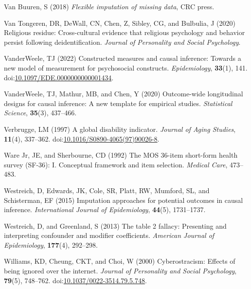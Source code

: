 \documentclass[
  singlecolumn,
  9pt]{article}
\newlength{\cslhangindent}
\newenvironment{CSLReferences}[2] %
 {\begin{list}{}{%
  \setlength{\itemindent}{0pt}
  \setlength{\leftmargin}{0pt}
  \setlength{\parsep}{0pt}
  \ifodd #1
   \setlength{\leftmargin}{\cslhangindent}
   \setlength{\itemindent}{-1\cslhangindent}
  \fi
  \setlength{\itemsep}{#2\baselineskip}}}
 {\end{list}}
\begin{document}
\begin{CSLReferences}{1}{0}
Van Buuren, S (2018) \emph{Flexible imputation of missing data}, CRC
press.

Van Tongeren, DR, DeWall, CN, Chen, Z, Sibley, CG, and Bulbulia, J
(2020) Religious residue: Cross-cultural evidence that religious
psychology and behavior persist following deidentification.
\emph{Journal of Personality and Social Psychology}.

VanderWeele, TJ (2022) Constructed measures and causal inference:
Towards a new model of measurement for psychosocial constructs.
\emph{Epidemiology}, \textbf{33}(1), 141.
doi:\href{https://doi.org/10.1097/EDE.0000000000001434}{10.1097/EDE.0000000000001434}.

VanderWeele, TJ, Mathur, MB, and Chen, Y (2020) Outcome-wide
longitudinal designs for causal inference: A new template for empirical
studies. \emph{Statistical Science}, \textbf{35}(3), 437--466.

Verbrugge, LM (1997) A global disability indicator. \emph{Journal of
Aging Studies}, \textbf{11}(4), 337--362.
doi:\href{https://doi.org/10.1016/S0890-4065(97)90026-8}{10.1016/S0890-4065(97)90026-8}.

Ware Jr, JE, and Sherbourne, CD (1992) The MOS 36-item short-form health
survey (SF-36): I. Conceptual framework and item selection.
\emph{Medical Care}, 473--483.

Westreich, D, Edwards, JK, Cole, SR, Platt, RW, Mumford, SL, and
Schisterman, EF (2015) Imputation approaches for potential outcomes in
causal inference. \emph{International Journal of Epidemiology},
\textbf{44}(5), 1731--1737.

Westreich, D, and Greenland, S (2013) The table 2 fallacy: Presenting
and interpreting confounder and modifier coefficients. \emph{American
Journal of Epidemiology}, \textbf{177}(4), 292--298.

Williams, KD, Cheung, CKT, and Choi, W (2000) Cyberostracism: Effects of
being ignored over the internet. \emph{Journal of Personality and Social
Psychology}, \textbf{79}(5), 748--762.
doi:\href{https://doi.org/10.1037/0022-3514.79.5.748}{10.1037/0022-3514.79.5.748}.


\end{CSLReferences}
\end{document}
